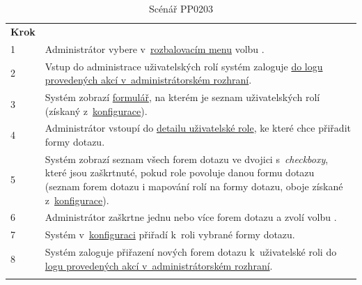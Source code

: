 \documentclass[thesis=M,czech]{FITthesis}[2019/12/23]
\begin{document}
	\begin{longtable}{|p{}|p{}|}
		\rowcolor{Gray}\multicolumn{2}{|l|}{\textbf{Základní scénář}} \\ \hline
		\textbf{Krok} & \\ \hline
		1 & Administrátor vybere v~\hyperref[RozbalovaciMenu]{rozbalovacím menu} volbu \uv{Uživatelské role}. \\ \hline
		2 & Vstup do administrace uživatelských rolí systém zaloguje \hyperref[Logy]{do logu provedených akcí v~administrátorském rozhraní}. \\ \hline
		3 & Systém zobrazí \hyperref[O07UzivatelskeRole]{formulář}, na kterém je seznam uživatelských rolí (získaný z~\hyperref[Konfigurace]{konfigurace}). \\ \hline
		4 & Administrátor vstoupí do \hyperref[O08UzivatelskaRoleDetail]{detailu uživatelské role}, ke které chce přiřadit formy dotazu. \\ \hline
		5 & Systém zobrazí seznam všech forem dotazu ve dvojici s~\textit{checkboxy}, které jsou zaškrtnuté, pokud role povoluje danou formu dotazu (seznam forem dotazu i mapování rolí na formy dotazu, oboje získané z~\hyperref[Konfigurace]{konfigurace}). \\ \hline
		6 & Administrátor zaškrtne jednu nebo více forem dotazu a zvolí volbu \uv{Uložit}. \\ \hline
		7 & Systém v~\hyperref[Konfigurace]{konfiguraci} přiřadí k~roli vybrané formy dotazu. \\ \hline
		8 & Systém zaloguje přiřazení nových forem dotazu k~uživatelské roli do \hyperref[Logy]{logu provedených akcí v~administrátorském rozhraní}. \\ \hline
		\caption{Scénář PP0203}
		\label{tab:Scénář PP0203}
	\end{longtable}

\newpage
\end{document}
